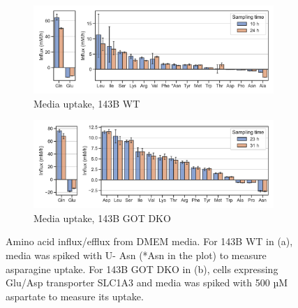 \begin{figure}
     \centering
     \begin{subfigure}[b]{0.75\textwidth}
         \centering
         \includegraphics[width=\textwidth]{figures/chap2/flux_143wt.pdf}
         \caption{Media uptake, 143B WT}
         \label{fig:ch2:flux_143wt}
     \end{subfigure}
     \begin{subfigure}[b]{0.75\textwidth}
         \centering
         \includegraphics[width=\textwidth]{figures/chap2/flux_143dko.pdf}
         \caption{Media uptake, 143B GOT DKO}
         \label{fig:ch2:flux_143dko}
     \end{subfigure}
        \caption[Media amino acid uptake.]{
        Amino acid influx/efflux from DMEM media.
        For 143B WT in (a), media was spiked with U-\hCi{} Asn (*Asn in the plot) to measure asparagine uptake.
        For 143B GOT DKO in (b), cells expressing Glu/Asp transporter SLC1A3 and media was spiked with 500 µM aspartate to measure its uptake.
        }
        \label{fig:ch2:flux_143wt_dko}
\end{figure}

